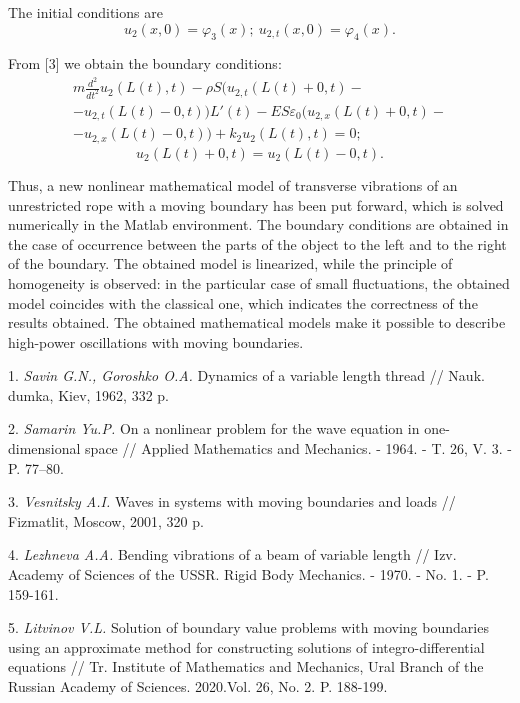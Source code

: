 The initial conditions are
\begin{equation} \label{GrindEQ__7_} 
u_{2} (x,0)=\varphi _{3} (x); \ u_{2,t} (x,0)=\varphi _{4} (x). 
\end{equation} 

From [3] we obtain the boundary conditions:
\begin{equation} \label{GrindEQ__8_}
    \begin{gathered}
        m\frac{d^{2} }{dt^{2} } u_{2} \left(L(t),t\right)-\rho S(u_{2,t} \left(L(t)+0,t\right)- \\
        -u_{2,t} \left(L(t)-0,t\right))L'(t)-ES\varepsilon _{0} (u_{2,x} \left(L(t)+0,t\right)-\\
        -u_{2,x} \left(L(t)-0,t\right))+k_{2} u_{2} \left(L(t),t\right)=0;
    \end{gathered}
\end{equation} 
$$u_{2} \left(L(t)+0,t\right)=u_{2} \left(L(t)-0,t\right).$$ 

Thus, a new nonlinear mathematical model of transverse vibrations of an unrestricted rope with a moving boundary has been put forward, which is solved numerically in the Matlab environment.
The boundary conditions are obtained in the case of occurrence between the parts of the object to the left and to the right of the boundary.
The obtained model is linearized, while the principle of homogeneity is observed: in the particular case of small fluctuations,
the obtained model coincides with the classical one, which indicates the correctness of the results obtained.
The obtained mathematical models make it possible to describe high-power oscillations with moving boundaries.


\litlist


1. {\it Savin G.N., Goroshko O.A.} Dynamics of a variable length thread // Nauk. dumka, Kiev, 1962, 332 p.

2. {\it Samarin Yu.P.} On a nonlinear problem for the wave equation in one-dimensional space // Applied Mathematics and Mechanics. - 1964. - T. 26, V. 3. - P. 77--80.

3. {\it Vesnitsky A.I.} Waves in systems with moving boundaries and loads // Fizmatlit, Moscow, 2001, 320 p.

4. {\it Lezhneva A.A.} Bending vibrations of a beam of variable length // Izv. Academy of Sciences of the USSR. Rigid Body Mechanics. - 1970. - No. 1. - P. 159-161.

5. {\it Litvinov V.L.} Solution of boundary value problems with moving boundaries using an approximate method for constructing solutions of integro-differential equations // Tr. Institute of Mathematics and Mechanics, Ural Branch of the Russian Academy of Sciences. 2020.Vol. 26, No. 2. P. 188-199.


